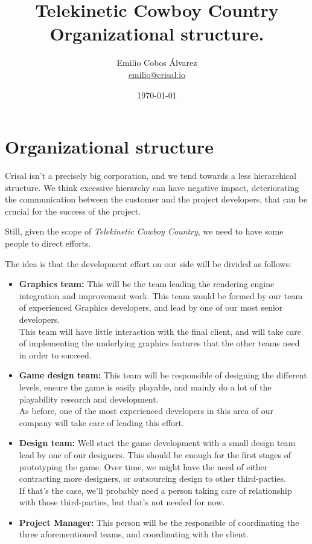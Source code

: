 \documentclass{article}
\title{
  Telekinetic Cowboy Country \\
  \small Organizational structure.
}
\author{
  Emilio Cobos Álvarez \\
  \small \href{mailto:emilio@crisal.io}{emilio@crisal.io}
}
\date{\today}
\begin{document}
\maketitle

\clearpage

\section{Organizational structure}

  Crisal isn't a precisely big corporation, and we tend towards a less
  hierarchical structure. We think excessive hierarchy can have negative impact,
  deteriorating the communication between the customer and the project
  developers, that can be crucial for the success of the project.

  Still, given the scope of {\it Telekinetic Cowboy Country}, we need to have
  some people to direct efforts.

  The idea is that the development effort on our side will be divided as
  follows:

  \begin{itemize}
    \item {\bf Graphics team:} This will be the team leading the rendering
      engine integration and improvement work. This team would be formed by
      our team of experienced Graphics developers, and lead by one of our most
      senior developers. \\

      This team will have little interaction with the final client, and will
      take care of implementing the underlying graphics features that the other
      teams need in order to succeed.

    \item {\bf Game design team:} This team will be responsible of designing the
      different levels, ensure the game is easily playable, and mainly do a lot
      of the playability research and development. \\

      As before, one of the most experienced developers in this area of our
      company will take care of leading this effort.

    \item {\bf Design team:} Well start the game development with a small design
      team lead by one of our designers. This should be enough for the first
      stages of prototyping the game. Over time, we might have the need of
      either contracting more designers, or outsourcing design to other
      third-parties.  \\

      If that's the case, we'll probably need a person taking care of
      relationship with those third-parties, but that's not needed for now.

    \item {\bf Project Manager:} This person will be the responsible of
      coordinating the three aforementioned teams, and coordinating with the
      client.
  \end{itemize}
\end{document}
